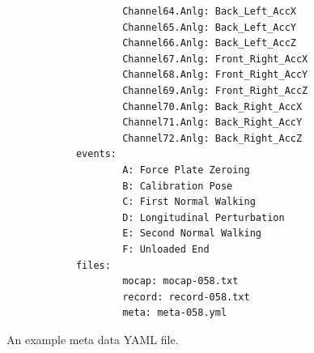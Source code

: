 \documentclass{article}
\begin{document}
\begin{figure}
\begin{verbatim}
                    Channel64.Anlg: Back_Left_AccX
                    Channel65.Anlg: Back_Left_AccY
                    Channel66.Anlg: Back_Left_AccZ
                    Channel67.Anlg: Front_Right_AccX
                    Channel68.Anlg: Front_Right_AccY
                    Channel69.Anlg: Front_Right_AccZ
                    Channel70.Anlg: Back_Right_AccX
                    Channel71.Anlg: Back_Right_AccY
                    Channel72.Anlg: Back_Right_AccZ
            events:
                    A: Force Plate Zeroing
                    B: Calibration Pose
                    C: First Normal Walking
                    D: Longitudinal Perturbation
                    E: Second Normal Walking
                    F: Unloaded End
            files:
                    mocap: mocap-058.txt
                    record: record-058.txt
                    meta: meta-058.yml
  \end{verbatim}
  \caption{An example meta data YAML file.}
  \label{fig:example-meta-data}
\end{figure}
\end{document}
